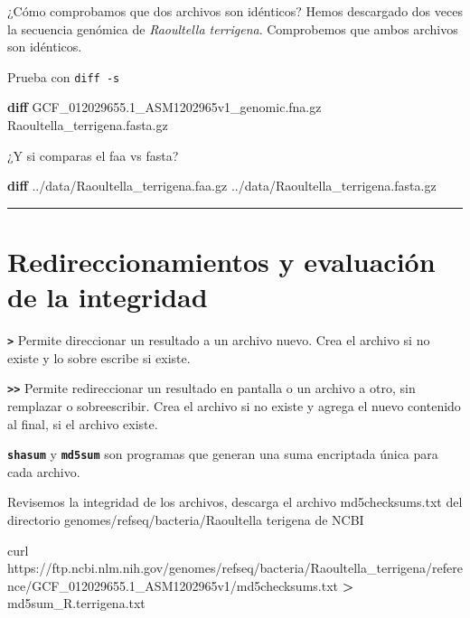 \documentclass[
]{book}
\newenvironment{Shaded}{\begin{snugshade}}{\end{snugshade}}
\newcommand{\ExtensionTok}[1]{#1}
\newcommand{\FunctionTok}[1]{\textcolor[rgb]{0.13,0.29,0.53}{\textbf{#1}}}
\newcommand{\NormalTok}[1]{#1}
\newcommand{\OperatorTok}[1]{\textcolor[rgb]{0.81,0.36,0.00}{\textbf{#1}}}
\begin{document}
¿Cómo comprobamos que dos archivos son idénticos? Hemos descargado dos veces la secuencia genómica de \emph{Raoultella terrigena}. Comprobemos que ambos archivos son idénticos.

Prueba con \texttt{diff\ -s}

\begin{Shaded}
\begin{Highlighting}[]
\FunctionTok{diff}\NormalTok{ GCF\_012029655.1\_ASM1202965v1\_genomic.fna.gz Raoultella\_terrigena.fasta.gz}
\end{Highlighting}
\end{Shaded}

¿Y si comparas el faa vs fasta?

\begin{Shaded}
\begin{Highlighting}[]
\FunctionTok{diff}\NormalTok{ ../data/Raoultella\_terrigena.faa.gz ../data/Raoultella\_terrigena.fasta.gz}
\end{Highlighting}
\end{Shaded}

\begin{center}\rule{0.5\linewidth}{0.5pt}\end{center}

\section{Redireccionamientos y evaluación de la integridad}\label{redireccionamientos-y-evaluaciuxf3n-de-la-integridad}

\textbf{\texttt{\textgreater{}}} Permite direccionar un resultado a un archivo nuevo. Crea el archivo si no existe y lo sobre escribe si existe.

\textbf{\texttt{\textgreater{}\textgreater{}}} Permite redireccionar un resultado en pantalla o un archivo a otro, sin remplazar o sobreescribir. Crea el archivo si no existe y agrega el nuevo contenido al final, si el archivo existe.

\textbf{\texttt{shasum}} y \textbf{\texttt{md5sum}} son programas que generan una suma encriptada única para cada
archivo.

Revisemos la integridad de los archivos, descarga el archivo md5checksums.txt del directorio genomes/refseq/bacteria/Raoultella terigena de NCBI

\begin{Shaded}
\begin{Highlighting}[]
\ExtensionTok{curl}\NormalTok{ https://ftp.ncbi.nlm.nih.gov/genomes/refseq/bacteria/Raoultella\_terrigena/reference/GCF\_012029655.1\_ASM1202965v1/md5checksums.txt }\OperatorTok{\textgreater{}}
\ExtensionTok{md5sum\_R.terrigena.txt}
\end{Highlighting}
\end{Shaded}
\end{document}
